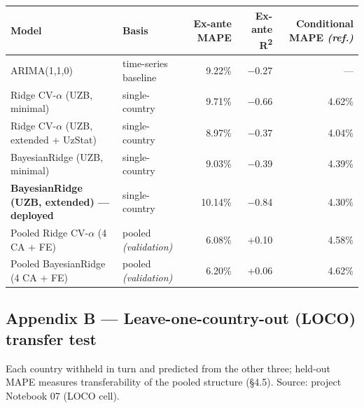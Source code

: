\documentclass[10pt,twocolumn]{article}
\begin{document}
\begin{table}[tp]
\centering
\renewcommand{\arraystretch}{1.18}\small
\begin{tabularx}{\textwidth}{LLrrr}
\toprule
\textbf{Model} & \textbf{Basis} & \textbf{Ex-ante MAPE} & \textbf{Ex-ante R\textsuperscript{2}} & \textbf{Conditional MAPE \textit{(ref.)}} \\
\midrule
ARIMA(1,1,0) & time-series baseline & 9.22\% & $-$0.27 & --- \\
Ridge CV-$\alpha$ (UZB, minimal) & single-country & 9.71\% & $-$0.66 & 4.62\% \\
Ridge CV-$\alpha$ (UZB, extended + UzStat) & single-country & 8.97\% & $-$0.37 & 4.04\% \\
BayesianRidge (UZB, minimal) & single-country & 9.03\% & $-$0.39 & 4.39\% \\
\textbf{BayesianRidge (UZB, extended) --- deployed} & single-country & 10.14\% & $-$0.84 & 4.30\% \\
Pooled Ridge CV-$\alpha$ (4 CA + FE) & pooled \textit{(validation)} & 6.08\% & +0.10 & 4.58\% \\
Pooled BayesianRidge (4 CA + FE) & pooled \textit{(validation)} & 6.20\% & +0.06 & 4.62\% \\
\bottomrule
\end{tabularx}
\par{}
\end{table}

\subsection*{Appendix B --- Leave-one-country-out (LOCO) transfer test}

Each country withheld in turn and predicted from the other three; held-out MAPE measures transferability of the pooled structure (\S{}4.5). Source: project Notebook 07 (LOCO cell).
\end{document}
